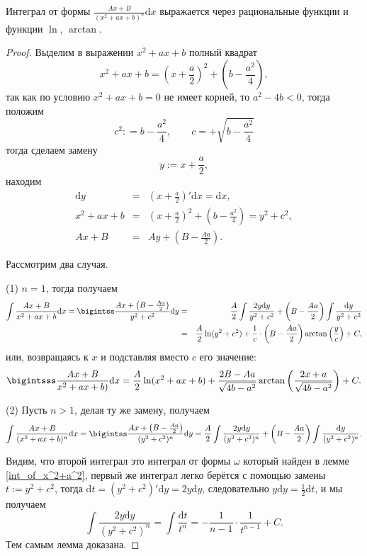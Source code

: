 \begin{lemma}\label{int_of_prime} Интеграл от формы $\frac{Ax + B}{(x^2 + ax + b)^n}\mathrm{d}x$ выражается через рациональные функции и функции $\ln$, $\arctan$.
\end{lemma}
\begin{proof}
Выделим в выражении $x^2 + ax + b$ полный квадрат
\[
 x^2 + ax + b = \left(x+ \frac{a}{2} \right)^2 + \left(b - \frac{a^2}{4} \right),
\]
так как по условию $x^2 + ax + b =0$ не имеет корней, то $a^2 - 4b <0$, тогда положим 
\[
 c^2: = b- \frac{a^2}{4}, \qquad c = + \sqrt{b- \frac{a^2}{4}}
\]
тогда сделаем замену 
\[
y:= x+ \frac{a}{2},
\]
находим
\begin{eqnarray*}
    \mathrm{d}y &=& \left( x+ \frac{a}{2}\right)' \mathrm{d}x = \mathrm{d}x,\\
    x^2 + ax + b &=& \left(x+ \frac{a}{2} \right)^2 + \left(b - \frac{a^2}{4} \right) = y^2 + c^2, \\
    Ax + B &= & Ay + \left(B - \frac{Aa}{2} \right).
\end{eqnarray*}

Рассмотрим два случая.

(1) $n = 1$, тогда получаем
\begin{eqnarray*}
    \int \frac{Ax + B}{x^2 + ax + b}\mathrm{d}x = \bigintss \frac{Ax + \left( B - \frac{Aa}{2} \right)}{y^2 + c^2}\mathrm{d}y &=& \frac{A}{2} \int \frac{2y\mathrm{d}y}{y^2 + c^2} + \left( B - \frac{Aa}{2} \right) \int \frac{\mathrm{d}y}{y^2 + c^2} \\
    &=& \frac{A}{2} \ln(y^2 + c^2) + \frac{1}{c} \cdot \left( B - \frac{Aa}{2} \right)\arctan\left(\frac{y}{c}\right) + C,
\end{eqnarray*}
или, возвращаясь к $x$ и подставляя вместо $c$ его значение:
  \[
   \bigintsss \frac{Ax + B}{x^2 + ax + b)}\mathrm{d}x =  \frac{A}{2}\ln(x^2 + ax + b) + \frac{2B-Aa}{\sqrt{4b-a^2}}\arctan\left( \frac{2x+a}{\sqrt{4b-a^2}} \right) + C.
  \]

(2) Пусть $n >1$, делая ту же замену, получаем
\[
    \int \frac{Ax + B}{(x^2 + ax + b)^n}\mathrm{d}x = \bigintss \frac{Ax + \left( B - \frac{Aa}{2} \right)}{(y^2 + c^2)^n}\mathrm{d}y = \frac{A}{2} \int \frac{2y\mathrm{d}y}{(y^2 + c^2)^n} + \left( B - \frac{Aa}{2} \right) \int \frac{\mathrm{d}y}{(y^2 + c^2)^n}.
\]

Видим, что второй интеграл это интеграл от формы $\omega$ который найден в лемме \ref{int_of_x^2+a^2}, первый же интеграл легко берётся с помощью замены $t:=y^2 + c^2 $, тогда $\mathrm{d}t = (y^2 + c^2)'\mathrm{d}y = 2y\mathrm{d}y$, следовательно $y\mathrm{d}y = \frac{1}{2}\mathrm{d}t$, и мы получаем
\[
 \int \frac{2y\mathrm{d}y}{(y^2 + c^2)^n} = \int \frac{\mathrm{d}t}{t^n} = - \frac{1}{n-1}\cdot \frac{1}{t^{n-1}} +C.
\]
Тем самым лемма доказана.
\end{proof}

